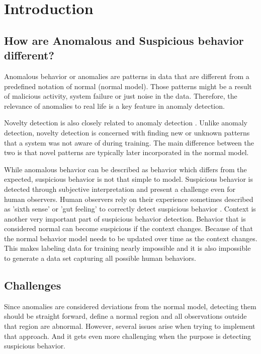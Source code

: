 \chapter{Introduction}\label{ch:introduction}

\section{How are Anomalous and Suspicious behavior different?}

Anomalous behavior or anomalies are patterns in data that are different from a predefined notation of normal (normal model). Those patterns might be a result of malicious activity, system failure or just noise in the data. Therefore, the relevance of anomalies to real life is a key feature in anomaly detection.

Novelty detection is also closely related to anomaly detection \cite{n16,n17}. Unlike anomaly detection, novelty detection is concerned with finding new or unknown patterns that a system was not aware of during training. The main difference between the two is that novel patterns are typically later incorporated in the normal model.

While anomalous behavior can be described as behavior which differs from the expected, suspicious behavior is not that simple to model. Suspicious behavior is detected through subjective interpretation and present a challenge even for human observers. Human observers rely on their experience sometimes described as 'sixth sense' or 'gut feeling' to correctly detect suspicious behavior \cite{n18}. Context is another very important part of suspicious behavior detection. Behavior that is considered normal can become suspicious if the context changes. Because of that the normal behavior model needs to be updated over time as the context changes. This makes labeling data for training nearly impossible and it is also impossible to generate a data set capturing all possible human behaviors.


\section{Challenges}

Since anomalies are considered deviations from the normal model, detecting them should be straight forward, define a normal region and all observations outside that region are abnormal. However, several issues arise when trying to implement that approach. And it gets even more challenging when the purpose is detecting suspicious behavior.

